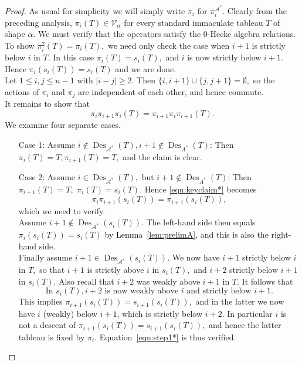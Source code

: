 \documentclass[12pt,letterpaper]{amsart}
\newcommand{\svw}{\textcolor{black}}
\theoremstyle{definition}
\DeclareMathOperator{\Des}{Des}
\begin{document}
\begin{proof} As usual for simplicity we will simply write $\pi_i$ for $\pi_i^{\mathcal{A}^*}$. Clearly from the preceding analysis, $\pi_i(T)\in \mathcal{V}_\alpha$  for every standard immaculate tableau $T$ of shape $\alpha.$ We must verify that the operators satisfy the 0-Hecke algebra relations.
\\
To show $\pi_i^2(T)=\pi_i(T),$ we need only check the case when $i+1$ is strictly below $i$ in $T$. In this case $\pi_i(T)=s_i(T),$ and $i$ is now strictly below $i+1$. Hence $\pi_i(s_i(T))=s_i(T)$ and we are done.
\\
Let $1\le i,j\le n-1$ with $|i-j|\ge 2.$ Then $\{i, i+1\}\cup \{j, j+1\}=\emptyset,$ so the actions of $\pi_i$ and $\pi_j$ are independent of each other, and hence commute.
\\
It remains to show that 
\begin{equation}\label{eqn:keyclaim*}\pi_i \pi_{i+1} \pi_i(T)=\pi_{i+1} \pi_i \pi_{i+1}(T).
\end{equation}  We examine  four separate cases.
\begin{enumerate}
\item[Case 1:] Assume $i\notin \Des_{\mathcal{A}^*}(T), i+1\notin \Des_{A^*}(T)$: 
Then $\pi_i(T)=T, \pi_{i+1}(T)=T, $ and the claim is clear.
\item[Case 2:] Assume $i\in \Des_{\mathcal{A}^*}(T), \text{ but }i+1\notin \Des_{A^*}(T)$:  Then $\pi_{i+1}(T)=T,$ 
 $\pi_i(T)=s_i(T).$  Hence \eqref{eqn:keyclaim*} becomes 
\begin{equation}\label{eqn:step1*}\pi_i \pi_{i+1} ( s_i(T))= \pi_{i+1}(s_i(T)),
\end{equation}
which we need to verify.  
\\
Assume $i+1\notin \Des_{\mathcal{A}^*}(s_i(T)).$ 
The left-hand side then equals $\pi_i(s_i(T))=s_i(T)$  by \svw{Lemma~\ref{lem:prelimA},} and this is also the right-hand side. 
\\
Finally assume $i+1\in \Des_{\mathcal{A}^*}(s_i(T)).$   We now have $i+1$ strictly below $i$ in $T,$ so that $i+1$ is strictly above $i$ in $s_i(T),$ and $i+2$ strictly below $i+1$ in $s_i(T).$   Also recall that $i+2$ was weakly above $i+1$ in $T.$ It follows that 
\begin{equation}\label{eqn:step2*} \text{In } s_i(T),  i+2 \text{ is now weakly above } i 
\text{ and strictly below }i+1. \end{equation}  
This implies $\pi_{i+1}(s_i(T))=s_{i+1}(s_i(T)),$ and in the latter we now have $i$ (weakly) below \svw{$i+1$,} which is strictly below $i+2.$ In particular $i$ is not a descent of $\pi_{i+1}(s_i(T))=s_{i+1}(s_i(T)),$ and hence the latter tableau is fixed by $\pi_i.$ Equation~\eqref{eqn:step1*} is thus verified.

\end{enumerate}
\end{proof}
\end{document}
